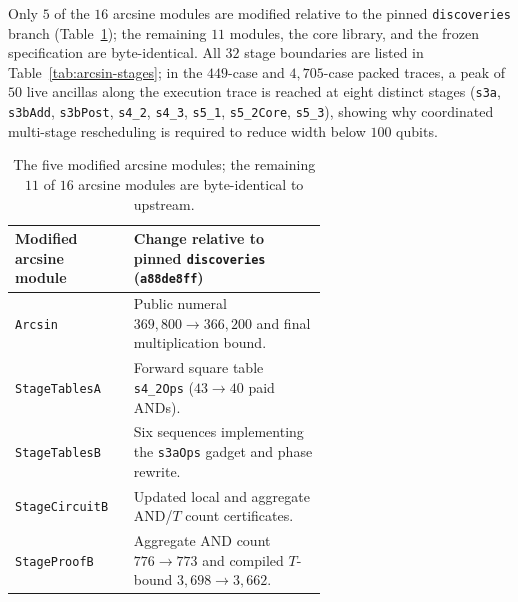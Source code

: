 \documentclass[11pt,a4paper]{article}
\newcommand{\RA}{\raggedright\arraybackslash}
\theoremstyle{definition}
\theoremstyle{remark}
\begin{document}
Only \(5\) of the \(16\) arcsine modules are modified relative to the pinned \texttt{discoveries} branch (Table~\ref{tab:arcsin-patch}); the remaining \(11\) modules, the core library, and the frozen specification are byte-identical. All \(32\) stage boundaries are listed in Table~\ref{tab:arcsin-stages}; in the \(449\)-case and \(4{,}705\)-case packed traces, a peak of \(50\) live ancillas along the execution trace is reached at eight distinct stages (\texttt{s3a}, \texttt{s3bAdd}, \texttt{s3bPost}, \texttt{s4\_2}, \texttt{s4\_3}, \texttt{s5\_1}, \texttt{s5\_2Core}, \texttt{s5\_3}), showing why coordinated multi-stage rescheduling is required to reduce width below \(100\) qubits.

\begin{table}[htbp]
\centering\small
\begin{tabular}{@{}l>{\RA}p{0.62\linewidth}@{}}
\toprule
Modified arcsine module & Change relative to pinned \texttt{discoveries} (\texttt{a88de8ff}) \\
\midrule
\texttt{Arcsin}        & Public numeral \(369{,}800 \to 366{,}200\) and final multiplication bound. \\
\texttt{StageTablesA}  & Forward square table \texttt{s4\_2Ops} (\(43 \to 40\) paid ANDs). \\
\texttt{StageTablesB}  & Six sequences implementing the \texttt{s3aOps} gadget and phase rewrite. \\
\texttt{StageCircuitB} & Updated local and aggregate AND/\(T\) count certificates. \\
\texttt{StageProofB}   & Aggregate AND count \(776 \to 773\) and compiled \(T\)-bound \(3{,}698 \to 3{,}662\). \\
\bottomrule
\end{tabular}
\caption{The five modified arcsine modules; the remaining \(11\) of \(16\) arcsine modules are byte-identical to upstream.}
\label{tab:arcsin-patch}
\end{table}
\end{document}
